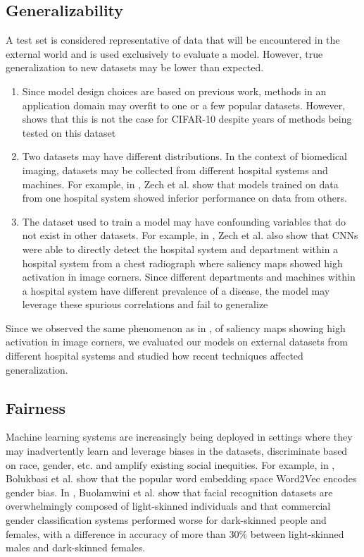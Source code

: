 \documentclass[12pt,twoside,a4paper]{report}
\begin{document}
\subsection{Generalizability}
A test set is considered representative of data that will be encountered in the
external world and is used exclusively to evaluate a model. However, true
generalization to new datasets may be lower than expected.
\begin{enumerate}
\item{Since model design choices are based on previous work, methods in an
    application domain may overfit to one or a few popular datasets. However,
    \cite{recht2018cifar} shows that this is not the case for CIFAR-10 despite
    years of methods being tested on this dataset}
\item{Two datasets may have different distributions. In the context of
    biomedical imaging, datasets may be collected from different hospital
    systems and machines. For example, in \cite{zech2018variable}, Zech et al.
    show that models trained on data from one hospital system showed inferior
    performance on data from others.}
\item{The dataset used to train a model may have confounding variables that do
    not exist in other datasets. For example, in \cite{zech2018variable}, Zech
    et al. also show that CNNs were able to directly detect the hospital system
    and department within a hospital system from a chest radiograph where
    saliency maps showed high activation in image corners. Since different
    departments and machines within a hospital system have different prevalence
    of a disease, the model may leverage these spurious correlations and fail to
    generalize}
\end{enumerate}
Since we observed the same phenomenon as in \cite{zech2018variable}, of saliency
maps showing high activation in image corners, we evaluated our models on
external datasets from different hospital systems and studied how recent
techniques affected generalization.

\subsection{Fairness}
Machine learning systems are increasingly being deployed in settings where they
may inadvertently learn and leverage biases in the datasets, discriminate based
on race, gender, etc. and amplify existing social inequities. For example, in
\cite{bolukbasi2016man}, Bolukbasi et al. show that the popular word embedding
space Word2Vec encodes gender bias. In \cite{buolamwini2018gender}, Buolamwini
et al. show that facial recognition datasets are overwhelmingly composed of
light-skinned individuals and that commercial gender classification systems
performed worse for dark-skinned people and females, with a difference in
accuracy of more than 30\% between
light-skinned males and dark-skinned females.\\
\end{document}
